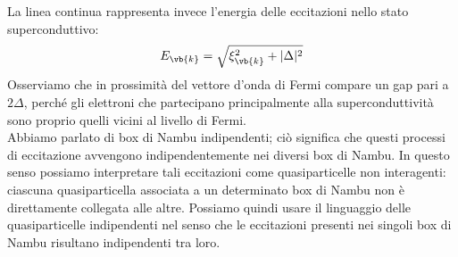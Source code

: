 La linea continua rappresenta invece l'energia delle eccitazioni nello stato superconduttivo:
\begin{equation*}
   E_{\vb{k}}
   =
   \sqrt{
      \xi_{\vb{k}}^2
      +
      |\Delta|^2
   }
\end{equation*}
Osserviamo che in prossimità del vettore d'onda di Fermi compare un gap pari a $2\Delta$, perché gli elettroni che partecipano principalmente alla superconduttività sono proprio quelli vicini al livello di Fermi.\\
Abbiamo parlato di box di Nambu indipendenti; ciò significa che questi processi di eccitazione avvengono indipendentemente nei diversi box di Nambu. In questo senso possiamo interpretare tali eccitazioni come quasiparticelle non interagenti: ciascuna quasiparticella associata a un determinato box di Nambu non è direttamente collegata alle altre. Possiamo quindi usare il linguaggio delle quasiparticelle indipendenti nel senso che le eccitazioni presenti nei singoli box di Nambu risultano indipendenti tra loro.
